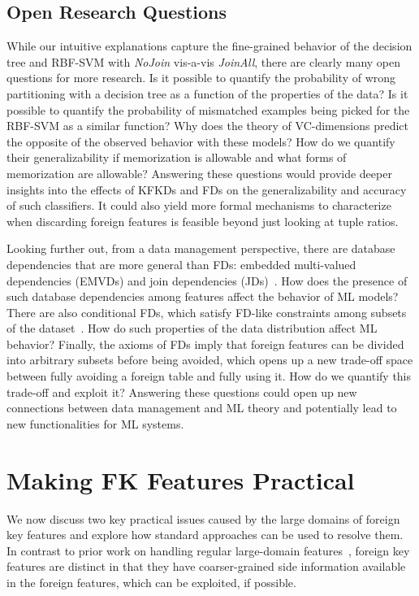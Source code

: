 \documentclass{vldb}
\begin{document}
\subsection{Open Research Questions}

While our intuitive explanations capture the fine-grained behavior of the decision tree and RBF-SVM with \textit{NoJoin} vis-a-vis \textit{JoinAll}, there are clearly many 
open questions for more research. Is it possible to quantify the probability of wrong partitioning with a decision tree as a function of the properties of 
the data? Is it possible to quantify the probability of mismatched examples being picked for the RBF-SVM as a similar function? Why does the theory of VC-dimensions predict 
the opposite of the observed behavior with these models? How do we quantify their generalizability if memorization is allowable and what forms of memorization are allowable?
Answering these questions would provide deeper insights into the effects of KFKDs and FDs on the generalizability and accuracy of such classifiers. It could also yield more 
formal mechanisms to characterize when discarding foreign features is feasible beyond just looking at tuple ratios.

Looking further out, from a data management perspective, there are database dependencies that are more general than FDs: 
embedded multi-valued dependencies (EMVDs) and join dependencies (JDs)~\cite{avibook}. How does the presence of such 
database dependencies among features affect the behavior of ML models? There are also conditional FDs, which satisfy FD-like 
constraints among subsets of the dataset~\cite{avibook}. How do such properties of the data distribution affect ML behavior?
Finally, the axioms of FDs imply that foreign features can be divided into arbitrary subsets before being avoided, which opens 
up a new trade-off space between fully avoiding a foreign table and fully using it. How do we quantify this trade-off and exploit it?
Answering these questions could open up new connections between data management and ML theory and potentially lead to 
new functionalities for ML systems.

\section{Making FK Features Practical}

We now discuss two key practical issues caused by the large domains of foreign key features and explore how standard approaches can be used to resolve them. 
In contrast to prior work on handling regular large-domain features~\cite{dtreebias1}, foreign key features are distinct in that they have coarser-grained 
side information available in the foreign features, which can be exploited, if possible.
\end{document}
